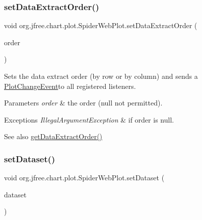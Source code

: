 \subsubsection{\texorpdfstring{set\+Data\+Extract\+Order()}{setDataExtractOrder()}}
{\footnotesize\ttfamily void org.\+jfree.\+chart.\+plot.\+Spider\+Web\+Plot.\+set\+Data\+Extract\+Order (\begin{DoxyParamCaption}\item[{Table\+Order}]{order }\end{DoxyParamCaption})}

Sets the data extract order (by row or by column) and sends a \mbox{\hyperlink{}{Plot\+Change\+Event}}to all registered listeners.


\begin{DoxyParams}{Parameters}
{\em order} & the order ({\ttfamily null} not permitted).\\
\hline
\end{DoxyParams}

\begin{DoxyExceptions}{Exceptions}
{\em Illegal\+Argument\+Exception} & if {\ttfamily order} is {\ttfamily null}.\\
\hline
\end{DoxyExceptions}
\begin{DoxySeeAlso}{See also}
\mbox{\hyperlink{classorg_1_1jfree_1_1chart_1_1plot_1_1_spider_web_plot_a858c1204ab0567e08d765226ff57d2b3}{get\+Data\+Extract\+Order()}} 
\end{DoxySeeAlso}
\mbox{\label{classorg_1_1jfree_1_1chart_1_1plot_1_1_spider_web_plot_a23333c2d4229d0ab0d4cf3671b661e0a}} 
\subsubsection{\texorpdfstring{set\+Dataset()}{setDataset()}}
{\footnotesize\ttfamily void org.\+jfree.\+chart.\+plot.\+Spider\+Web\+Plot.\+set\+Dataset (\begin{DoxyParamCaption}\item[{\mbox{\hyperlink{interfaceorg_1_1jfree_1_1data_1_1category_1_1_category_dataset}{Category\+Dataset}}}]{dataset }\end{DoxyParamCaption})}

